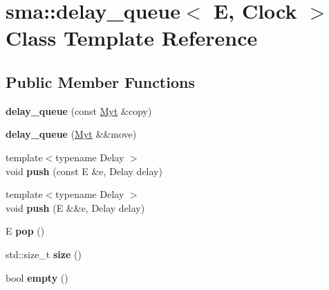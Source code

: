 \hypertarget{classsma_1_1delay__queue}{\section{sma\-:\-:delay\-\_\-queue$<$ E, Clock $>$ Class Template Reference}
\label{classsma_1_1delay__queue}
}
\subsection*{Public Member Functions}
\begin{DoxyCompactItemize}
\item 
\hypertarget{classsma_1_1delay__queue_a3f4359c098b76a43374cf19cf3be03db}{{\bfseries delay\-\_\-queue} (const \hyperlink{classsma_1_1delay__queue}{Myt} \&copy)}\label{classsma_1_1delay__queue_a3f4359c098b76a43374cf19cf3be03db}

\item 
\hypertarget{classsma_1_1delay__queue_a112dc1c9ccaef2d7404c6169f2041e89}{{\bfseries delay\-\_\-queue} (\hyperlink{classsma_1_1delay__queue}{Myt} \&\&move)}\label{classsma_1_1delay__queue_a112dc1c9ccaef2d7404c6169f2041e89}

\item 
\hypertarget{classsma_1_1delay__queue_a807d7957eb4beb292b59827aac37f945}{{\footnotesize template$<$typename Delay $>$ }\\void {\bfseries push} (const E \&e, Delay delay)}\label{classsma_1_1delay__queue_a807d7957eb4beb292b59827aac37f945}

\item 
\hypertarget{classsma_1_1delay__queue_abe4f1da5547d72a258562ecb3d2dbc06}{{\footnotesize template$<$typename Delay $>$ }\\void {\bfseries push} (E \&\&e, Delay delay)}\label{classsma_1_1delay__queue_abe4f1da5547d72a258562ecb3d2dbc06}

\item 
\hypertarget{classsma_1_1delay__queue_adb86370b1801fb9ee96028d0af54df89}{E {\bfseries pop} ()}\label{classsma_1_1delay__queue_adb86370b1801fb9ee96028d0af54df89}

\item 
\hypertarget{classsma_1_1delay__queue_acf49578574d2989128eb107616d56a26}{std\-::size\-\_\-t {\bfseries size} ()}\label{classsma_1_1delay__queue_acf49578574d2989128eb107616d56a26}

\item 
\hypertarget{classsma_1_1delay__queue_a0197b8d37227a176bfdd5bc5f8da9489}{bool {\bfseries empty} ()}\label{classsma_1_1delay__queue_a0197b8d37227a176bfdd5bc5f8da9489}


\end{DoxyCompactItemize}
